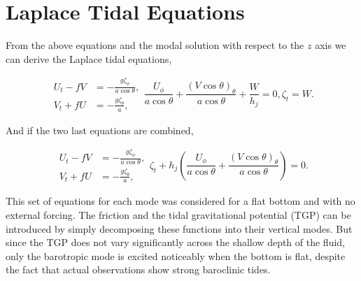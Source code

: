 \documentclass[11pt]{article}
\begin{document}

\section{Laplace Tidal Equations}

From the above equations and the modal solution with respect to the $z$ axis we can derive the Laplace tidal equations,

\begin{subequations}
\begin{align*}
U_t - f V &= -\frac{g \zeta_\phi}{a \cos\theta}, \\
V_t + f U &= -\frac{g \zeta_\theta}{a},
\end{align*}
\begin{equation*}
\frac{U_\phi}{a\cos\theta}+\frac{(V\cos\theta)_\theta}{a\cos\theta}+\frac{W}{h_j} = 0,
\end{equation*}
\begin{equation*}
\zeta_t = W.
\end{equation*}
\end{subequations}

And if the two last equations are combined,

\begin{subequations}
\begin{align*}
U_t - f V &= -\frac{g \zeta_\phi}{a \cos\theta}, \\
V_t + f U &= -\frac{g \zeta_\theta}{a},
\end{align*}
\begin{equation*}
\zeta_t+h_j\left(\frac{U_\phi}{a\cos\theta}+\frac{(V\cos\theta)_\theta}{a\cos\theta}\right) = 0.
\end{equation*}
\end{subequations}

This set of equations for each mode was considered for a flat bottom and with no external forcing. The friction and the tidal gravitational potential (TGP) can be introduced by simply decomposing these functions into their vertical modes. But since the TGP does not vary significantly across the shallow depth of the fluid, only the barotropic mode is excited noticeably when the bottom is flat, despite the fact that actual observations show strong baroclinic tides.
\end{document}
